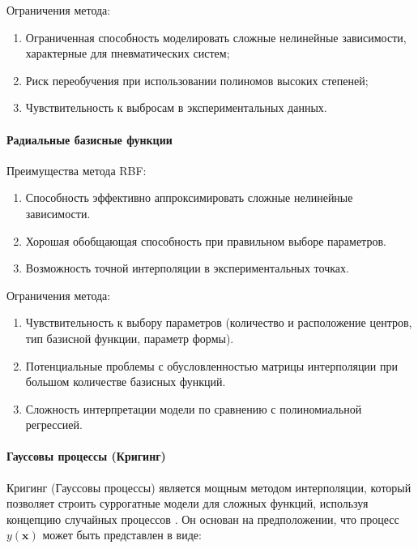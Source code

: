 Ограничения метода:
\begin{enumerate}
    \item Ограниченная способность моделировать сложные нелинейные зависимости, характерные для пневматических систем;
    \item Риск переобучения при использовании полиномов высоких степеней;
    \item Чувствительность к выбросам в экспериментальных данных.
\end{enumerate}

\paragraph{Радиальные базисные функции}\label{sec:ch4/sec3/subsec1/subsubsec2}


Преимущества метода RBF:

\begin{enumerate}
    \item Способность эффективно аппроксимировать сложные нелинейные зависимости.
    \item Хорошая обобщающая способность при правильном выборе параметров.
    \item Возможность точной интерполяции в экспериментальных точках.
\end{enumerate}

Ограничения метода:

\begin{enumerate}
    \item Чувствительность к выбору параметров (количество и расположение центров, тип базисной функции, параметр формы).
    \item Потенциальные проблемы с обусловленностью матрицы интерполяции при большом количестве базисных функций.
    \item Сложность интерпретации модели по сравнению с полиномиальной регрессией.
\end{enumerate}

\paragraph{Гауссовы процессы (Кригинг)}\label{sec:ch4/sec3/subsec1/subsubsec3}

Кригинг (Гауссовы процессы) является мощным методом интерполяции,
который позволяет строить суррогатные модели для сложных функций,
используя концепцию случайных процессов \cite{gramacy2020surrogates}. Он основан
на предположении, что процесс \( y(\mathbf{x}) \) может быть представлен в виде:

